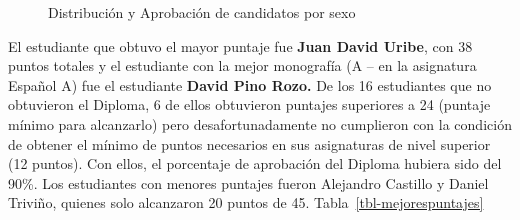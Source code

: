 \documentclass[
  letterpaper,
  DIV=11,
  numbers=noendperiod]{scrartcl}
\begin{document}
\begin{figure}

\begin{minipage}[t]{0.50\linewidth}

{\centering 


}

\end{minipage}%
%
\begin{minipage}[t]{0.50\linewidth}

{\centering 


}

\end{minipage}%

\caption{\label{fig-distribucion-aprobacion-sexo}Distribución y
Aprobación de candidatos por sexo}

\end{figure}

El estudiante que obtuvo el mayor puntaje fue \textbf{Juan David Uribe},
con 38 puntos totales y el estudiante con la mejor monografía (A -- en
la asignatura Español A) fue el estudiante \textbf{David Pino Rozo.} De
los 16 estudiantes que no obtuvieron el Diploma, 6 de ellos obtuvieron
puntajes superiores a 24 (puntaje mínimo para alcanzarlo) pero
desafortunadamente no cumplieron con la condición de obtener el mínimo
de puntos necesarios en sus asignaturas de nivel superior (12 puntos).
Con ellos, el porcentaje de aprobación del Diploma hubiera sido del
90\%. Los estudiantes con menores puntajes fueron Alejandro Castillo y
Daniel Triviño, quienes solo alcanzaron 20 puntos de 45.
Tabla~\ref{tbl-mejorespuntajes}
\end{document}

